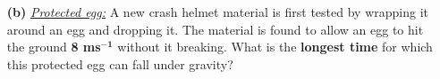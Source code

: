 \documentclass[A4,12pt]{article}
\begin{document}
\begin{enumerate}[label=\bfseries (\arabic*)]
\begin{itemize}
    \item[\bf (b)] \href{https://isaacphysics.org/questions/cracking_eggs?board=1669d0ef-9884-4339-9d26-ec50e04fd189}{\it Protected egg:} A new crash helmet material is first tested by wrapping it around an egg and dropping it. The material is found to allow an egg to hit the ground \textbf{8 ms}$\bm{^{-1}}$ without it breaking. What is the \textbf{longest time} for which this protected egg can fall under gravity?

\end{itemize}
\end{enumerate}
\end{document}
